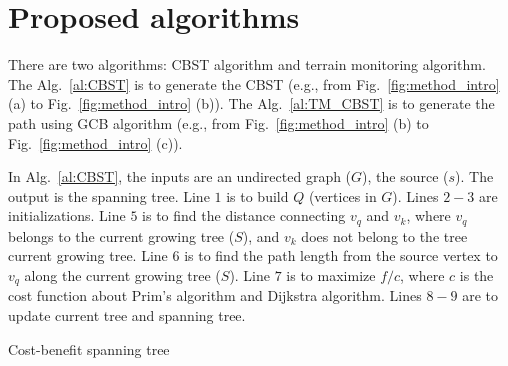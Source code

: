 \chapter{Proposed algorithms}
There are two algorithms: CBST algorithm and terrain monitoring algorithm.
The Alg.~\ref{al:CBST} is to generate the CBST (e.g., from Fig.~\ref{fig:method_intro} (a) to Fig.~\ref{fig:method_intro} (b)).
The Alg.~\ref{al:TM_CBST} is to generate the path using GCB algorithm (e.g.,  from Fig.~\ref{fig:method_intro} (b) to Fig.~\ref{fig:method_intro} (c)).


In Alg.~\ref{al:CBST}, the inputs are an undirected graph ($G$), the source ($s$).
The output is the spanning tree.
Line $1$ is to build $Q$ (vertices in $G$).
Lines $2-3$ are initialization{\color{olive}s}.
Line $5$ is to find the distance connecting $v_q$ and $v_k$, where $v_q$ belongs to the current growing tree ($S$), and $v_k$ does not belong to the tree current growing tree.
Line $6$ is to find the path length from the source vertex to $v_q$ along the current growing tree ($S$).
Line $7$ is to maximize $f/c$, where $c$ is the cost function about Prim's algorithm and Dijkstra algorithm.
Lines $8-9$ are to update current tree and spanning tree.


\begin{algorithm}[htbp]	
	\caption{Cost-benefit spanning tree}
	\begin{algorithmic}[1]
    \ENDWHILE	
    \end{algorithmic}	
	\label{al:CBST}
\end{algorithm}

